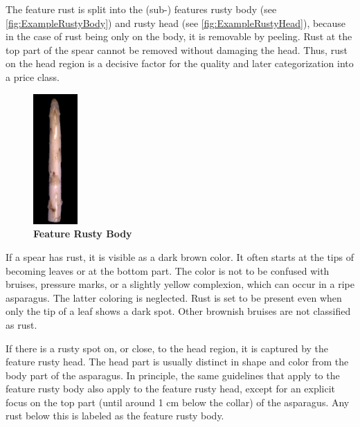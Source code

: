 The feature rust is split into the (sub-) features rusty body (see \autoref{fig:ExampleRustyBody}) and rusty head (see \autoref{fig:ExampleRustyHead}), because in the case of rust being only on the body, it is removable by peeling. Rust at the top part of the spear cannot be removed without damaging the head. Thus, rust on the head region is a decisive factor for the quality and later categorization into a price class.

\begin{figure}
  \begin{center}
    \includegraphics[width=0.15\textwidth]{Figures/chapter03/example_img_rustybody.png}
  \end{center}
  \vspace{-15pt}
  \caption[Example Image Feature Rusty Body]{ \textbf{Feature Rusty Body}}
  \vspace{15pt}
  \label{fig:ExampleRustyBody}
\end{figure}

If a spear has rust, it is visible as a dark brown color. It often starts at the tips of becoming leaves or at the bottom part. The color is not to be confused with bruises, pressure marks, or a slightly yellow complexion, which can occur in a ripe asparagus. The latter coloring is neglected.
Rust is set to be present even when only the tip of a leaf shows a dark spot. Other brownish bruises are not classified as rust.

If there is a rusty spot on, or close, to the head region, it is captured by the feature rusty head. The head part is usually distinct in shape and color from the body part of the asparagus. In principle, the same guidelines that apply to the feature rusty body also apply to the feature rusty head, except for an explicit focus on the top part (until around 1 cm below the collar) of the asparagus. Any rust below this is labeled as the feature rusty body.

